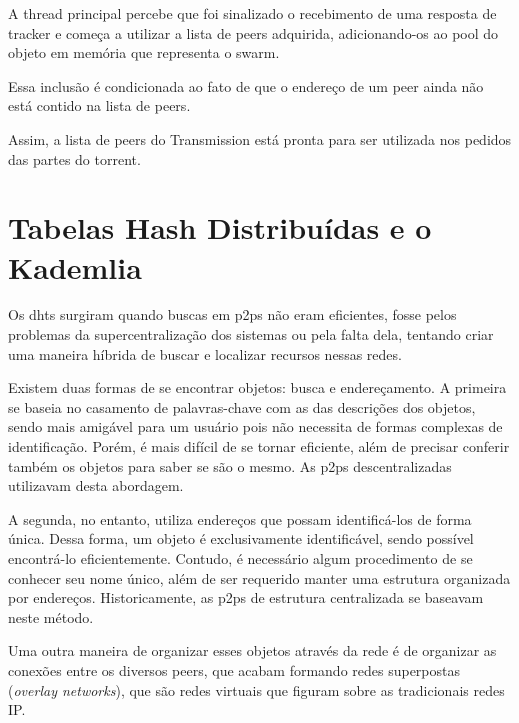 \begin{itemize}
A \gls*{thread} principal percebe que foi sinalizado o recebimento de uma resposta de
\gls*{tracker} e começa a utilizar a lista de \glspl*{peer} adquirida, adicionando-os ao
\gls{pool} do objeto em memória que representa o \gls{swarm}.


Essa inclusão é condicionada ao fato de que o endereço de um \gls*{peer} ainda não está
contido na lista de \glspl*{peer}.


Assim, a lista de \glspl*{peer} do Transmission está pronta para ser utilizada nos
pedidos das partes do \gls*{torrent}.

\newpage
\section{Tabelas Hash Distribuídas e o Kademlia}

Os \glspl{dht} surgiram quando buscas em \glspl{p2p} não eram eficientes, fosse pelos
problemas da supercentralização dos sistemas ou pela falta dela, tentando criar uma
maneira híbrida de buscar e localizar recursos nessas redes.

Existem duas formas de se encontrar objetos: busca e endereçamento. A primeira se baseia
no casamento de palavras-chave com as das descrições dos objetos, sendo mais amigável
para um usuário pois não necessita de formas complexas de identificação. Porém, é mais
difícil de se tornar eficiente, além de precisar conferir também os objetos para saber
se são o mesmo. As \glspl*{p2p} descentralizadas utilizavam desta abordagem.

A segunda, no entanto, utiliza endereços que possam identificá-los de forma única. Dessa
forma, um objeto é exclusivamente identificável, sendo possível encontrá-lo
eficientemente. Contudo, é necessário algum procedimento de se conhecer seu nome único,
além de ser requerido manter uma estrutura organizada por endereços. Historicamente, as
\glspl*{p2p} de estrutura centralizada se baseavam neste método.

Uma outra maneira de organizar esses objetos através da rede é de organizar as conexões
entre os diversos \glspl*{peer}, que acabam formando redes superpostas (\emph{overlay
networks}), que são redes virtuais que figuram sobre as tradicionais redes IP.


\end{itemize}
